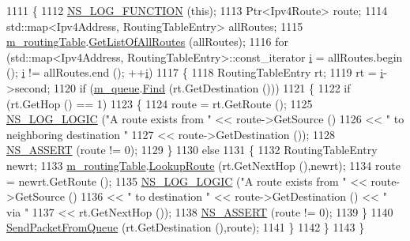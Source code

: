 \begin{DoxyCode}
1111 \{
1112   \hyperlink{log-macros-disabled_8h_a90b90d5bad1f39cb1b64923ea94c0761}{NS\_LOG\_FUNCTION} (\textcolor{keyword}{this});
1113   Ptr<Ipv4Route> route;
1114   std::map<Ipv4Address, RoutingTableEntry> allRoutes;
1115   \hyperlink{classns3_1_1dsdv_1_1RoutingProtocol_acc4cee466c2591e35f508ce58097a00e}{m\_routingTable}.\hyperlink{classns3_1_1dsdv_1_1RoutingTable_af980697df819d8a00ee8782c705e3dac}{GetListOfAllRoutes} (allRoutes);
1116   \textcolor{keywordflow}{for} (std::map<Ipv4Address, RoutingTableEntry>::const\_iterator \hyperlink{bernuolliDistribution_8m_a6f6ccfcf58b31cb6412107d9d5281426}{i} = allRoutes.begin (); 
      \hyperlink{bernuolliDistribution_8m_a6f6ccfcf58b31cb6412107d9d5281426}{i} != allRoutes.end (); ++\hyperlink{bernuolliDistribution_8m_a6f6ccfcf58b31cb6412107d9d5281426}{i})
1117     \{
1118       RoutingTableEntry rt;
1119       rt = \hyperlink{bernuolliDistribution_8m_a6f6ccfcf58b31cb6412107d9d5281426}{i}->second;
1120       \textcolor{keywordflow}{if} (\hyperlink{classns3_1_1dsdv_1_1RoutingProtocol_a3ed623ade7d7244ed1ff5e0f6a399a68}{m\_queue}.\hyperlink{classns3_1_1dsdv_1_1PacketQueue_a13a16f813e0f9a67b2ab4ee3b1f10c70}{Find} (rt.GetDestination ()))
1121         \{
1122           \textcolor{keywordflow}{if} (rt.GetHop () == 1)
1123             \{
1124               route = rt.GetRoute ();
1125               \hyperlink{group__logging_ga88acd260151caf2db9c0fc84997f45ce}{NS\_LOG\_LOGIC} (\textcolor{stringliteral}{"A route exists from "} << route->GetSource ()
1126                                                    << \textcolor{stringliteral}{" to neighboring destination "}
1127                                                    << route->GetDestination ());
1128               \hyperlink{assert_8h_a6dccdb0de9b252f60088ce281c49d052}{NS\_ASSERT} (route != 0);
1129             \}
1130           \textcolor{keywordflow}{else}
1131             \{
1132               RoutingTableEntry newrt;
1133               \hyperlink{classns3_1_1dsdv_1_1RoutingProtocol_acc4cee466c2591e35f508ce58097a00e}{m\_routingTable}.\hyperlink{classns3_1_1dsdv_1_1RoutingTable_a0bfb9dc677f02bd740973865e38df763}{LookupRoute} (rt.GetNextHop (),newrt);
1134               route = newrt.GetRoute ();
1135               \hyperlink{group__logging_ga88acd260151caf2db9c0fc84997f45ce}{NS\_LOG\_LOGIC} (\textcolor{stringliteral}{"A route exists from "} << route->GetSource ()
1136                                                    << \textcolor{stringliteral}{" to destination "} << route->GetDestination () << \textcolor{stringliteral}{"
       via "}
1137                                                    << rt.GetNextHop ());
1138               \hyperlink{assert_8h_a6dccdb0de9b252f60088ce281c49d052}{NS\_ASSERT} (route != 0);
1139             \}
1140           \hyperlink{classns3_1_1dsdv_1_1RoutingProtocol_a9359912928dc5b8dc851366a78c0cc8c}{SendPacketFromQueue} (rt.GetDestination (),route);
1141         \}
1142     \}
1143 \}
\end{DoxyCode}


